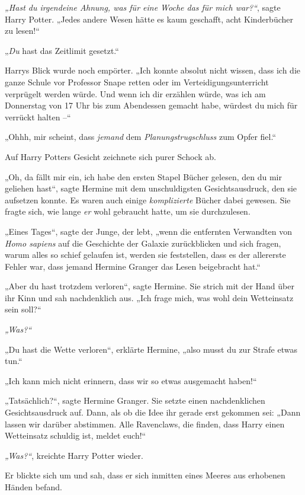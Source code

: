 {\emph{„Hast du irgendeine Ahnung, was für eine Woche das für mich war?“}, sagte Harry Potter. „Jedes andere Wesen hätte es kaum geschafft, acht Kinderbücher zu lesen!“

„\emph{Du} hast das Zeitlimit gesetzt.“

Harrys Blick wurde noch empörter. „Ich konnte absolut nicht wissen, dass ich die ganze Schule vor Professor Snape retten oder im Verteidigungsunterricht verprügelt werden würde. Und wenn ich dir erzählen würde, was ich am Donnerstag von 17 Uhr bis zum Abendessen gemacht habe, würdest du mich für verrückt halten --“

„Ohhh, mir scheint, dass \emph{jemand} dem \emph{Planungstrugschluss} zum Opfer fiel.“

Auf Harry Potters Gesicht zeichnete sich purer Schock ab.

„Oh, da fällt mir ein, ich habe den ersten Stapel Bücher gelesen, den du mir geliehen hast“, sagte Hermine mit dem unschuldigsten Gesichtsausdruck, den sie aufsetzen konnte. Es waren auch einige \emph{komplizierte} Bücher dabei gewesen. Sie fragte sich, wie lange \emph{er} wohl gebraucht hatte, um sie durchzulesen.

„Eines Tages“, sagte der Junge, der lebt, „wenn die entfernten Verwandten von \emph{Homo sapiens} auf die Geschichte der Galaxie zurückblicken und sich fragen, warum alles so schief gelaufen ist, werden sie feststellen, dass es der allererste Fehler war, dass jemand Hermine Granger das Lesen beigebracht hat.“

„Aber du hast trotzdem verloren“, sagte Hermine. Sie strich mit der Hand über ihr Kinn und sah nachdenklich aus. „Ich frage mich, was wohl dein Wetteinsatz sein soll?“

\emph{„Was?“}

„Du hast die Wette verloren“, erklärte Hermine, „also musst du zur Strafe etwas tun.“

„Ich kann mich nicht erinnern, dass wir so etwas ausgemacht haben!“

„Tatsächlich?“, sagte Hermine Granger. Sie setzte einen nachdenklichen Gesichtsausdruck auf. Dann, als ob die Idee ihr gerade erst gekommen sei: „Dann lassen wir darüber abstimmen. Alle Ravenclaws, die finden, dass Harry einen Wetteinsatz schuldig ist, meldet euch!“

\emph{„Was?“}, kreichte Harry Potter wieder.

Er blickte sich um und sah, dass er sich inmitten eines Meeres aus erhobenen Händen befand.

}
